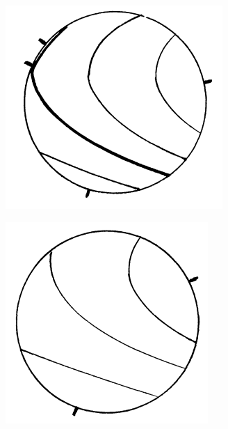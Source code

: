 \documentclass[dvipsnames]{beamer}
\begin{document}
\begin{frame}
\begin{columns}
\begin{column}{0.5\textwidth}
\begin{figure}
\begin{subfigure}{0.3\textwidth}
                    \includegraphics[width=\textwidth]{cs_fig1.png}
                \end{subfigure}
                \begin{subfigure}{0.3\textwidth}
                    \centering
                    \includegraphics[width=\textwidth]{cs_fig2.png}

\end{subfigure}
\end{figure}
\end{column}
\end{columns}
\end{frame}
\end{document}
